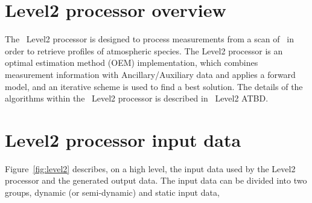 \section{Level2 processor overview}

The \smr\ Level2 processor is designed to process
measurements from a scan of \smr\ in order to
retrieve profiles of atmospheric species.    
The Level2 processor is an optimal estimation method (OEM)
implementation, which combines measurement
information with Ancillary/Auxiliary data
and applies a forward model, and an iterative
scheme is used to find a best solution.   
The details of the algorithms within the
\smr\ Level2 processor is described in \smr\ Level2 ATBD.

\section{Level2 processor input data}

Figure~\ref{fig:level2} describes, on a high level, the input data used
by the Level2 processor and the generated output data.
The input data can be divided into two groups,
dynamic (or semi-dynamic) and static input data,

